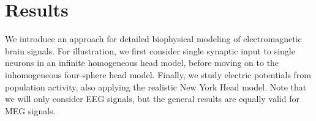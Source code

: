 \documentclass[preprint,10pt,authoryear]{elsarticle}
\newcommand{\hlb}[2][NavyBlue]{ {\sethlcolor{#1} \hl{#2}} }
\newcommand{\hlg}[2][Emerald]{ {\sethlcolor{#1} \hl{#2}} }
\newcommand{\snnote}[1]{\color{white}{\hlb{SN: #1 }}\color{black}}
\newcommand{\sntxt}[1]{{\color{NavyBlue}#1}}
\newcommand{\tvnnote}[1]{\color{white}{\hlg{TVN: #1 }}\color{black}}
\begin{document}
%
%

\section{Results}\label{sec:results}
\normalsize

\sntxt{
We introduce an approach for detailed biophysical modeling of electromagnetic brain signals. For illustration, we first consider single synaptic input to single neurons in an infinite homogeneous head model, before moving on to the inhomogeneous four-sphere head model. Finally, we study electric potentials from population activity, also applying the realistic New York Head model. Note that we will only consider EEG signals, but the general results are equally valid for MEG signals.}
%
\end{document}

